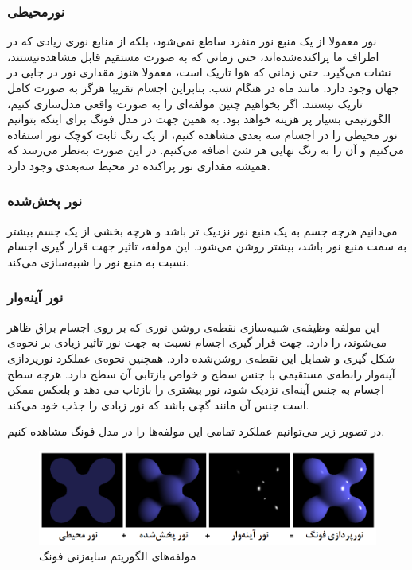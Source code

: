 \subsubsection{نورمحیطی}

نور معمولا از یک منبع نور منفرد ساطع نمی‌شود، بلکه
از منابع نوری زیادی که در اطراف ما پراکنده‌شده‌اند،
حتی زمانی که به صورت مستقیم قابل مشاهده‌نیستند،
نشات می‌گیرد.
حتی زمانی که هوا تاریک است، معمولا هنوز مقداری 
نور در جایی در جهان وجود دارد.
مانند ماه در هنگام شب.
بنابراین اجسام تقریبا هرگز به صورت کامل 
تاریک نیستند.
اگر بخواهیم چنین مولفه‌ای را به صورت واقعی مدل‌سازی کنیم، 
الگورتیمی بسیار پر هزینه خواهد بود.
به همین جهت در مدل فونگ برای اینکه بتوانیم نور محیطی را 
در اجسام سه بعدی مشاهده کنیم، 
از یک رنگ ثابت کوچک نور استفاده می‌کنیم و آن را به 
رنگ نهایی هر شئ اضافه می‌کنیم.
در این صورت به‌نظر می‌رسد که همیشه مقداری نور پراکنده در محیط 
سه‌بعدی وجود دارد.
\cite{LearnOpenGLPhongShading}
\subsubsection{نور پخش‌شده}

می‌دانیم هرچه جسم به یک منبع نور نزدیک تر باشد و هرچه 
بخشی از یک جسم بیشتر به سمت منبع نور باشد، بیشتر روشن می‌شود.
این مولفه، تاثیر جهت قرار گیری 
اجسام نسبت به منبع نور را شبیه‌سازی می‌کند.
\cite{LearnOpenGLPhongShading}
\subsubsection{نور آینه‌وار}

این مولفه وظیفه‌ی شبیه‌سازی نقطه‌ی روشن نوری که 
بر روی اجسام براق ظاهر می‌شوند، را دارد.
جهت قرار گیری اجسام نسبت به جهت نور 
تاثیر زیادی بر نحوه‌ی شکل گیری و شمایل این 
نقطه‌ی روشن‌شده دارد.
همچنین نحوه‌ی عملکرد نورپردازی آینه‌وار رابطه‌ی مستقیمی با 
 جنس سطح و خواص بازتابی آن سطح دارد.
هرچه سطح اجسام به جنس آینه‌ای نزدیک شود، نور بیشتری را بازتاب می دهد 
و بلعکس ممکن است جنس آن مانند گچی باشد که نور زیادی را جذب خود می‌کند.
\cite{LearnOpenGLPhongShading}

در تصویر زیر می‌توانیم عملکرد تمامی این مولفه‌ها را در مدل فونگ مشاهده کنیم.

\begin{figure}[ht]
	\centerline{\includegraphics[width=\textwidth,height=\textheight,keepaspectratio]{Figures/Ch2/Phong_components.png}}

	\caption{مولفه‌های الگوریتم سایه‌زنی فونگ
    \cite{PhongShadingWikipedia}
    }
	\label{fig:PhongShadingWikipedia}
\end{figure}
